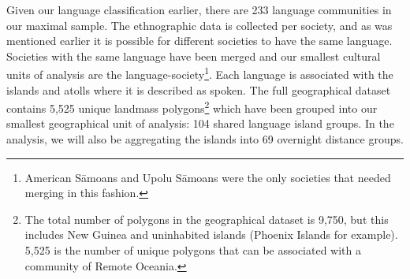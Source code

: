 \documentclass[unnumsec,webpdf,modern,medium]{oup-authoring-template}
\begin{document}
\begin{appendices}



Given our language classification earlier, there are 233 language communities in our maximal sample. The ethnographic data is collected per society, and as was mentioned earlier it is possible for different societies to have the same language. Societies with the same language have been merged and our smallest cultural units of analysis are the language-society\footnote{American S\={a}moans and Upolu S\={a}moans were the only societies that needed merging in this fashion.}. Each language is associated with the islands and atolls where it is described as spoken. The full geographical dataset contains 5,525 unique landmass polygons\footnote{The total number of polygons in the geographical dataset is 9,750, but this includes New Guinea and uninhabited islands (Phoenix Islands for example). 5,525 is the number of unique polygons that can be associated with a community of Remote Oceania.} which have been grouped into our smallest geographical unit of analysis: 104 shared language island groups. In the analysis, we will also be aggregating the islands into 69 overnight distance groups.


\end{appendices}
\end{document}
